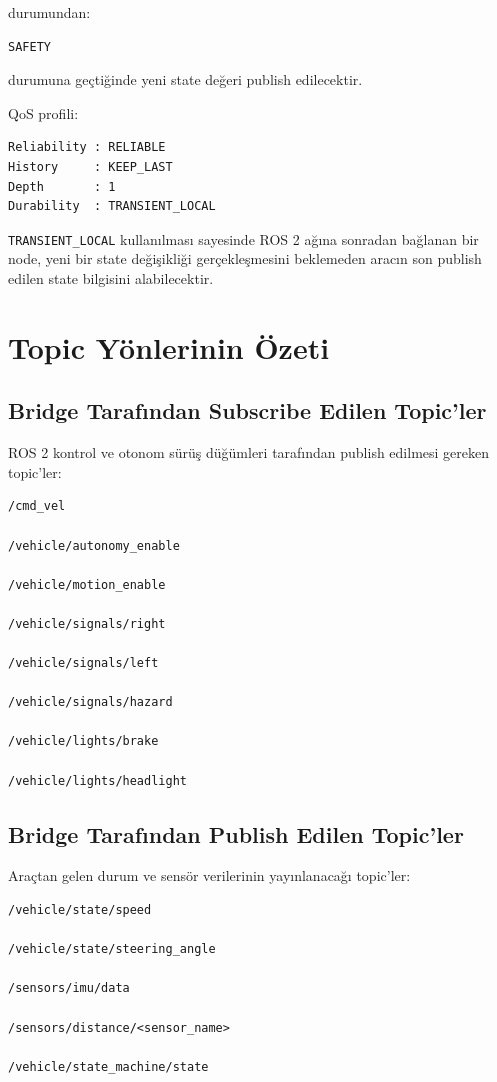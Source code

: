 \documentclass[12pt,a4paper]{article}
\begin{document}
durumundan:

\begin{verbatim}
SAFETY
\end{verbatim}

durumuna geçtiğinde yeni state değeri publish edilecektir.

QoS profili:

\begin{verbatim}
Reliability : RELIABLE
History     : KEEP_LAST
Depth       : 1
Durability  : TRANSIENT_LOCAL
\end{verbatim}

\texttt{TRANSIENT\_LOCAL} kullanılması sayesinde ROS 2 ağına sonradan
bağlanan bir node, yeni bir state değişikliği gerçekleşmesini beklemeden
aracın son publish edilen state bilgisini alabilecektir.

\section{Topic Yönlerinin Özeti}

\subsection{Bridge Tarafından Subscribe Edilen Topic'ler}

ROS 2 kontrol ve otonom sürüş düğümleri tarafından publish edilmesi
gereken topic'ler:

\begin{verbatim}
/cmd_vel

/vehicle/autonomy_enable

/vehicle/motion_enable

/vehicle/signals/right

/vehicle/signals/left

/vehicle/signals/hazard

/vehicle/lights/brake

/vehicle/lights/headlight
\end{verbatim}

\subsection{Bridge Tarafından Publish Edilen Topic'ler}

Araçtan gelen durum ve sensör verilerinin yayınlanacağı topic'ler:

\begin{verbatim}
/vehicle/state/speed

/vehicle/state/steering_angle

/sensors/imu/data

/sensors/distance/<sensor_name>

/vehicle/state_machine/state
\end{verbatim}
\end{document}
